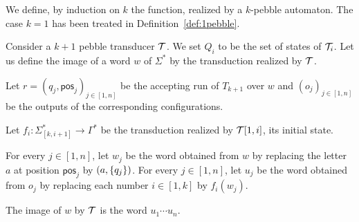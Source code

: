   \begin{definition}
We define, by induction on $k$ the function, realized by a $k$-pebble automaton. The case $k=1$ has been treated in Definition~\ref{def:1pebble}. 

Consider a $k+1$ pebble transducer ${\mathcal T}$. We set $Q_i$ to be the set of states of ${\mathcal T}_i$.
Let us define the image of a word $w$ of $\Sigma^*$ by the transduction realized by ${\mathcal T}$.

\noindent Let $r=(q_j,\mathsf{pos}_j)_{j\in[1, n]}$ be the accepting run of $T_{k+1}$ over $w$ and $(o_j)_{j\in[1, n]}$ be the outputs of the corresponding configurations.

\noindent Let $f_i:\Sigma_{[k,i+1]}^*\rightarrow \Gamma^*$ be the transduction realized by ${\mathcal T}[1,i]$,  its initial state.
 
 For every $j\in[1,n]$, let $w_j$ be the word obtained from $w$ by replacing the letter $a$ at position $\mathsf{pos}_j$ by $(a,\{q_j\})$.
    For every $j\in[1,n]$, let $u_j$ be the word obtained from $o_j$ by replacing each number $i\in [1,k]$ by $f_i(w_j)$.
    
The image of $w$ by ${\mathcal T}$ is the word $u_1\cdots u_n$.
\end{definition}

\begin{comment}

\begin{definition}
  We define, by induction on $k$ the function, realized by a $k$-pebble automaton. The case $k=1$ has been treated in Definition~\ref{def:1pebble}. 
  
  Consider a $k+1$ pebble transducer $\Tt$. We set $Q_i$ to be the set of states of $\Tt_i$.
  Let us define the image of a word $w$ of $\Sigma^*$ by the transduction realized by $\Tt$.
  
  \noindent Let $r=(q_j,\mathsf{pos}_j)_{j\in[1, n]}$ be the accepting run of $\Tt_{k+1}$ over $w$ and $(o_j)_{j\in[1, n]}$ be the outputs of the corresponding configurations.
  
  \noindent For every $q\in Q_i$, let $f^i_q:\Sigma_{[k,i+1]}^*\rightarrow \Gamma^*$ be the transduction realized by $\Tt[1,i]$, considering $q$ as its initial state.
   
   For every $j\in[1,n]$, let $w_j$ be the word obtained from $w$ by replacing the letter $a$ at position $\mathsf{pos}_j$ by $(a,k+1)$.
      For every $j\in[1,n]$, let $u_j$ be the word obtained from $o_j$ by replacing every state $q\in Q_i$ by $f^i_q(w_j)$.
      
  The image of $w$ by $\Tt$ is the word $(u_j)_{j\in[1,n]}$.
  \end{definition}

    
\end{comment}

